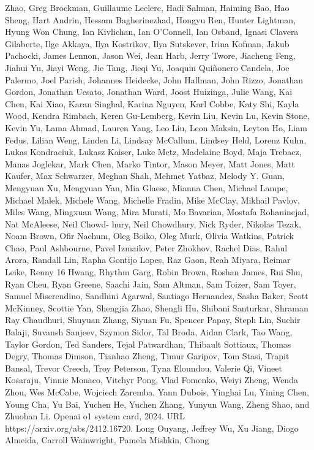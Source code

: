 Zhao, Greg Brockman, Guillaume Leclerc, Hadi Salman, Haiming Bao, Hao Sheng, Hart Andrin,
Hessam Bagherinezhad, Hongyu Ren, Hunter Lightman, Hyung Won Chung, Ian Kivlichan, Ian
O’Connell, Ian Osband, Ignasi Clavera Gilaberte, Ilge Akkaya, Ilya Kostrikov, Ilya Sutskever,
Irina Kofman, Jakub Pachocki, James Lennon, Jason Wei, Jean Harb, Jerry Twore, Jiacheng Feng,
Jiahui Yu, Jiayi Weng, Jie Tang, Jieqi Yu, Joaquin Quiñonero Candela, Joe Palermo, Joel Parish,
Johannes Heidecke, John Hallman, John Rizzo, Jonathan Gordon, Jonathan Uesato, Jonathan
Ward, Joost Huizinga, Julie Wang, Kai Chen, Kai Xiao, Karan Singhal, Karina Nguyen, Karl
Cobbe, Katy Shi, Kayla Wood, Kendra Rimbach, Keren Gu-Lemberg, Kevin Liu, Kevin Lu, Kevin
Stone, Kevin Yu, Lama Ahmad, Lauren Yang, Leo Liu, Leon Maksin, Leyton Ho, Liam Fedus,
Lilian Weng, Linden Li, Lindsay McCallum, Lindsey Held, Lorenz Kuhn, Lukas Kondraciuk,
Lukasz Kaiser, Luke Metz, Madelaine Boyd, Maja Trebacz, Manas Joglekar, Mark Chen, Marko
Tintor, Mason Meyer, Matt Jones, Matt Kaufer, Max Schwarzer, Meghan Shah, Mehmet Yatbaz,
Melody Y. Guan, Mengyuan Xu, Mengyuan Yan, Mia Glaese, Mianna Chen, Michael Lampe,
Michael Malek, Michele Wang, Michelle Fradin, Mike McClay, Mikhail Pavlov, Miles Wang,
Mingxuan Wang, Mira Murati, Mo Bavarian, Mostafa Rohaninejad, Nat McAleese, Neil Chowd-
hury, Neil Chowdhury, Nick Ryder, Nikolas Tezak, Noam Brown, Ofir Nachum, Oleg Boiko, Oleg
Murk, Olivia Watkins, Patrick Chao, Paul Ashbourne, Pavel Izmailov, Peter Zhokhov, Rachel Dias,
Rahul Arora, Randall Lin, Rapha Gontijo Lopes, Raz Gaon, Reah Miyara, Reimar Leike, Renny
16
Hwang, Rhythm Garg, Robin Brown, Roshan James, Rui Shu, Ryan Cheu, Ryan Greene, Saachi
Jain, Sam Altman, Sam Toizer, Sam Toyer, Samuel Miserendino, Sandhini Agarwal, Santiago
Hernandez, Sasha Baker, Scott McKinney, Scottie Yan, Shengjia Zhao, Shengli Hu, Shibani
Santurkar, Shraman Ray Chaudhuri, Shuyuan Zhang, Siyuan Fu, Spencer Papay, Steph Lin, Suchir
Balaji, Suvansh Sanjeev, Szymon Sidor, Tal Broda, Aidan Clark, Tao Wang, Taylor Gordon, Ted
Sanders, Tejal Patwardhan, Thibault Sottiaux, Thomas Degry, Thomas Dimson, Tianhao Zheng,
Timur Garipov, Tom Stasi, Trapit Bansal, Trevor Creech, Troy Peterson, Tyna Eloundou, Valerie
Qi, Vineet Kosaraju, Vinnie Monaco, Vitchyr Pong, Vlad Fomenko, Weiyi Zheng, Wenda Zhou,
Wes McCabe, Wojciech Zaremba, Yann Dubois, Yinghai Lu, Yining Chen, Young Cha, Yu Bai,
Yuchen He, Yuchen Zhang, Yunyun Wang, Zheng Shao, and Zhuohan Li. Openai o1 system card,
2024. URL https://arxiv.org/abs/2412.16720.
Long Ouyang, Jeffrey Wu, Xu Jiang, Diogo Almeida, Carroll Wainwright, Pamela Mishkin, Chong
